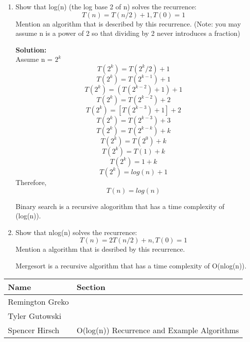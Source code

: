 \documentclass{article}
\begin{document}
\begin{enumerate}
    \item Show that log(n) (the log base 2 of n) solves the recurrence:
            \[T(n) = T(n/2) + 1, T(0) = 1\]
            Mention an algorithm that is described by this recurrence.
            (Note: you may assume n is a power of 2 so that dividing by 2
            never introduces a fraction)

            \textbf{Solution:}\\
            Assume n = $2^k$
            \[T(2^k) = T({2^k}/2) + 1\]
            \[T(2^k) = T(2^{k-1}) + 1\]
            \[T(2^k) = (T(2^{k-2}) + 1) + 1\]
            \[T(2^k) = T(2^{k-2}) + 2\]
            \[T(2^k) = [T(2^{k-3}) + 1] + 2\]
            \[T(2^k) = T(2^{k-3}) + 3\]
            \[T(2^k) = T(2^{k-k}) + k\]
            \[T(2^k) = T(2^{0}) + k\]
            \[T(2^k) = T(1) + k\]
            \[T(2^k) = 1 + k\]
            \[T(2^k) = log(n) + 1\]
            Therefore,\\
            \[T(n) = log(n)\]

            Binary search is a recursive alogorithm that has a time complexity
            of (log(n)).
        


    \item Show that nlog(n) solves the recurrence:
            \[T(n) = 2T(n/2) + n, T(0) = 1\]
            Mention a algorithm that is desribed by this recurrence.

            Mergesort is a recursive algorithm that has a time complexity 
            of O(nlog(n)).
\end{enumerate}

\bigskip

\pagebreak

\begin{center}
        \begin{tabular}{|p{3cm}|p{6cm}|}
            \hline
            \textbf{Name} & \textbf{Section} \\
            \hline
            Remington Greko & \\
            \hline
            Tyler Gutowski & \\
            \hline
            Spencer Hirsch & O(log(n)) Recurrence and Example Algorithms\\
            \hline
        \end{tabular}
    \end{center}
\end{document}
